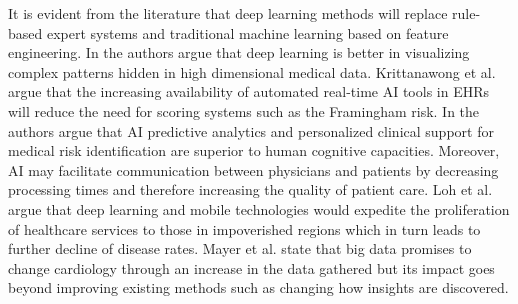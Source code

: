 \documentclass[journal]{IEEEtran}
\begin{document}
It is evident from the literature that deep learning methods will replace rule-based expert systems and traditional machine learning based on feature engineering.
In\cite{awan2018machine} the authors argue that deep learning is better in visualizing complex patterns hidden in high dimensional medical data.
Krittanawong et al.\cite{krittanawong2017artificial} argue that the increasing availability of automated real-time AI tools in EHRs will reduce the need for scoring systems such as the Framingham risk.
In\cite{krittanawong2017rise} the authors argue that AI predictive analytics and personalized clinical support for medical risk identification are superior to human cognitive capacities.
Moreover, AI may facilitate communication between physicians and patients by decreasing processing times and therefore increasing the quality of patient care.
Loh et al.\cite{loh2017deep} argue that deep learning and mobile technologies would expedite the proliferation of healthcare services to those in impoverished regions which in turn leads to further decline of disease rates.
Mayer et al.\cite{mayer2015big} state that big data promises to change cardiology through an increase in the data gathered but its impact goes beyond improving existing methods such as changing how insights are discovered.
\end{document}
